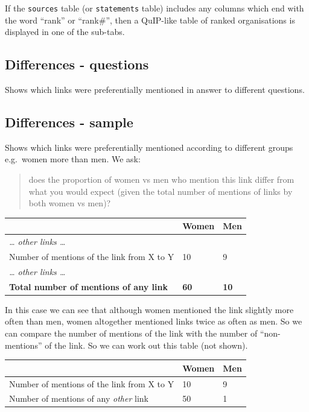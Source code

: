 \documentclass[
]{book}
\begin{document}
If the \texttt{sources} table (or \texttt{statements} table) includes any columns which end with the word ``rank'' or ``rank\#'', then a QuIP-like table of ranked organisations is displayed in one of the sub-tabs.

\hypertarget{differences---questions}{%
\subsection{Differences - questions}\label{differences---questions}}

Shows which links were preferentially mentioned in answer to different questions.

\hypertarget{differences---sample}{%
\subsection{Differences - sample}\label{differences---sample}}

Shows which links were preferentially mentioned according to different groups e.g.~women more than men. We ask:

\begin{quote}
does the proportion of women vs men who mention this link differ from what you would expect (given the total number of mentions of links by both women vs men)?
\end{quote}

\begin{longtable}[]{@{}lll@{}}
\toprule()
& Women & Men \\
\midrule()
\endhead
\emph{\ldots{} other links \ldots{}} & & \\
Number of mentions of the link from X to Y & 10 & 9 \\
\emph{\ldots{} other links \ldots{}} & & \\
\textbf{Total number of mentions of any link} & \textbf{60} & \textbf{10} \\
\bottomrule()
\end{longtable}

In this case we can see that although women mentioned the link slightly more often than men, women altogether mentioned links twice as often as men. So we can compare the number of mentions of the link with the number of ``non-mentions'' of the link. So we can work out this table (not shown).

\begin{longtable}[]{@{}lll@{}}
\toprule()
& Women & Men \\
\midrule()
\endhead
Number of mentions of the link from X to Y & 10 & 9 \\
Number of mentions of any \emph{other} link & 50 & 1 \\
\bottomrule()
\end{longtable}
\end{document}
